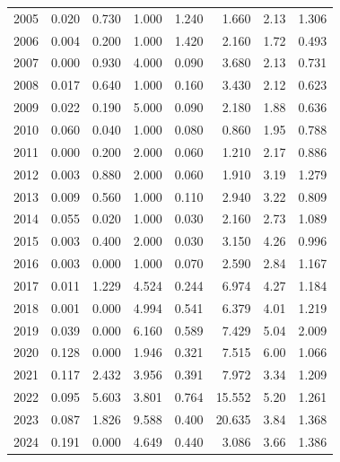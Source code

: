 \documentclass[
]{scrartcl}
\begin{document}
\begin{longtable}{rrrrrrrr}
2005 & 0.020 & 0.730 & 1.000 & 1.240 & 1.660 & 2.13 & 1.306 \\ 
2006 & 0.004 & 0.200 & 1.000 & 1.420 & 2.160 & 1.72 & 0.493 \\ 
2007 & 0.000 & 0.930 & 4.000 & 0.090 & 3.680 & 2.13 & 0.731 \\ 
2008 & 0.017 & 0.640 & 1.000 & 0.160 & 3.430 & 2.12 & 0.623 \\ 
2009 & 0.022 & 0.190 & 5.000 & 0.090 & 2.180 & 1.88 & 0.636 \\ 
2010 & 0.060 & 0.040 & 1.000 & 0.080 & 0.860 & 1.95 & 0.788 \\ 
2011 & 0.000 & 0.200 & 2.000 & 0.060 & 1.210 & 2.17 & 0.886 \\ 
2012 & 0.003 & 0.880 & 2.000 & 0.060 & 1.910 & 3.19 & 1.279 \\ 
2013 & 0.009 & 0.560 & 1.000 & 0.110 & 2.940 & 3.22 & 0.809 \\ 
2014 & 0.055 & 0.020 & 1.000 & 0.030 & 2.160 & 2.73 & 1.089 \\ 
2015 & 0.003 & 0.400 & 2.000 & 0.030 & 3.150 & 4.26 & 0.996 \\ 
2016 & 0.003 & 0.000 & 1.000 & 0.070 & 2.590 & 2.84 & 1.167 \\ 
2017 & 0.011 & 1.229 & 4.524 & 0.244 & 6.974 & 4.27 & 1.184 \\ 
2018 & 0.001 & 0.000 & 4.994 & 0.541 & 6.379 & 4.01 & 1.219 \\ 
2019 & 0.039 & 0.000 & 6.160 & 0.589 & 7.429 & 5.04 & 2.009 \\ 
2020 & 0.128 & 0.000 & 1.946 & 0.321 & 7.515 & 6.00 & 1.066 \\ 
2021 & 0.117 & 2.432 & 3.956 & 0.391 & 7.972 & 3.34 & 1.209 \\ 
2022 & 0.095 & 5.603 & 3.801 & 0.764 & 15.552 & 5.20 & 1.261 \\ 
2023 & 0.087 & 1.826 & 9.588 & 0.400 & 20.635 & 3.84 & 1.368 \\ 
2024 & 0.191 & 0.000 & 4.649 & 0.440 & 3.086 & 3.66 & 1.386 \\ 
\bottomrule

\end{longtable}

\endgroup

\begingroup
\fontsize{9.0pt}{10.8pt}\selectfont
\end{document}
